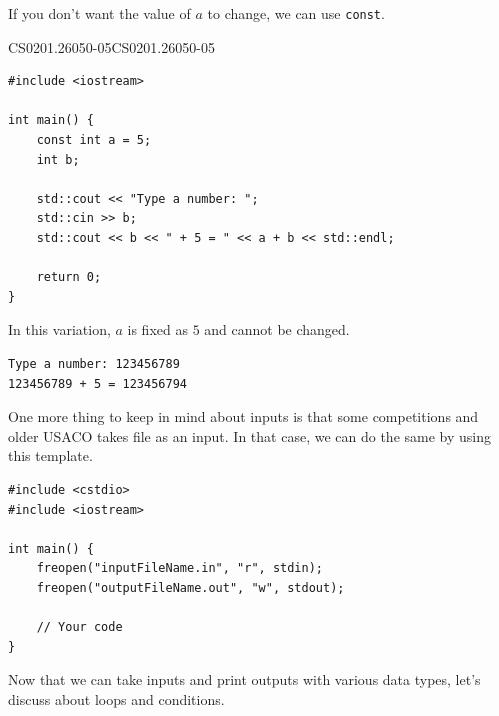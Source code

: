 \documentclass[../../main.tex]{subfiles}
\begin{document}
If you don't want the value of $a$ to change, we can use \verb|const|.

\begin{cppbox}{CS0201.26050-05}{CS0201.26050-05}
\begin{lstlisting}[style=cppstyle]
#include <iostream>

int main() {
    const int a = 5;
    int b;

    std::cout << "Type a number: ";
    std::cin >> b;
    std::cout << b << " + 5 = " << a + b << std::endl;
    
    return 0;
}
\end{lstlisting}
\end{cppbox}

In this variation, $a$ is fixed as $5$ and cannot be changed.

\begin{outputbox}
\begin{lstlisting}[style=basic]
Type a number: 123456789
123456789 + 5 = 123456794
\end{lstlisting}
\end{outputbox}

One more thing to keep in mind about inputs is that some competitions
and older USACO takes file as an input. In that case, we can do the
same by using this template.

\begin{basicbox}
\begin{lstlisting}[style=cppstyle]
#include <cstdio>
#include <iostream>

int main() {
    freopen("inputFileName.in", "r", stdin);
    freopen("outputFileName.out", "w", stdout);

    // Your code
}
\end{lstlisting}
\end{basicbox}

Now that we can take inputs and print outputs with various data types,
let's discuss about loops and conditions.
\end{document}
